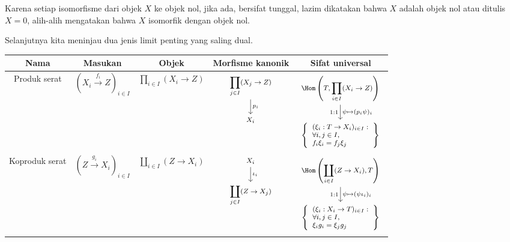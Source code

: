 Karena setiap isomorfisme dari objek $X$ ke objek nol, jika ada, bersifat
tunggal, lazim dikatakan bahwa $X$ adalah objek nol atau ditulis $X = 0$,
alih-alih mengatakan bahwa $X$ isomorfik dengan objek nol.

Selanjutnya kita meninjau dua jenis limit penting yang saling dual.

\begin{center}\small\setlength{\tabcolsep}{2.5pt}\begin{tabular}{|c|c|c|c|c|} \hline
	Nama & Masukan & Objek & Morfisme kanonik & Sifat universal \\ \hline
	Produk serat & $\left( X_i \xrightarrow{f_i} Z \right)_{i \in I}$ & $\displaystyle\prod_{i \in I} (X_i \to Z)$ & $\begin{tikzcd}[every cell/.append style={font = \footnotesize}] \displaystyle\prod_{j \in I} (X_j \to Z) \arrow[d, "p_i"] \\ X_i \end{tikzcd}$ & $\begin{tikzcd}[every cell/.append style={font = \footnotesize}]
		\Hom\left(T, \displaystyle\prod_{i \in I} (X_i \to Z) \right) \arrow[d, "1:1"', "{\psi \mapsto (p_i \psi)_i}"] \\
		\left\{\begin{array}{l} (\xi_i: T \to X_i)_{i \in I}: \\ \forall i,j \in I, \\ f_i \xi_i = f_j \xi_j \end{array}\right\}
	\end{tikzcd}$ \\
	Koproduk serat & $\left( Z \xrightarrow{g_i} X_i \right)_{i \in I}$ & $\displaystyle\coprod_{i \in I} (Z \to X_i)$ & $\begin{tikzcd}[every cell/.append style={font = \footnotesize}] X_i \arrow[d, "\iota_i"] \\ \displaystyle\coprod_{j \in I} (Z \to X_j) \end{tikzcd}$ & $\begin{tikzcd}[every cell/.append style={font = \footnotesize}]
		\Hom\left(\displaystyle\coprod_{i \in I} (Z \to X_i), T \right) \arrow[d, "1:1"', "{\psi \mapsto (\psi \iota_i)_i}"] \\
		\left\{\begin{array}{l} (\xi_i: X_i \to T)_{i \in I}: \\ \forall i,j \in I, \\ \xi_i g_i = \xi_j g_j \end{array}\right\}
	\end{tikzcd}$ \\ \hline
\end{tabular}\end{center}


